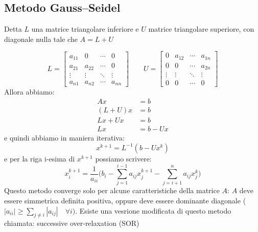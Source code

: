 \documentclass[10pt,a4paper]{article}
\begin{document}
\subsection{Metodo Gauss–Seidel}
Detta $L$ una matrice triangolare inferiore e $U$ matrice triangolare superiore, con diagonale nulla tale che $A = L + U$

\begin{equation}
L = 
\begin{bmatrix} 
a_{11} & 0 & \cdots & 0 \\ 
a_{21} & a_{22} & \cdots & 0 \\
\vdots & \vdots & \ddots & \vdots \\
a_{n1} & a_{n2} & \cdots & a_{nn} 
\end{bmatrix}
\qquad
U = 
\begin{bmatrix}
0 & a_{12} & \cdots & a_{1n} \\
0 & 0 & \cdots & a_{2n} \\
\vdots & \vdots & \ddots & \vdots \\
0 & 0 & \cdots & 0 
\end{bmatrix}
\end{equation}
Allora abbiamo:
\begin{align}
A x &= b \\
(L + U) x &= b \\
L x + U x &= b \\
L x &= b - U x
\end{align}
e quindi abbiamo in maniera iterativa:
\begin{equation}
x^{k+1} = L^{-1} (b - U x^{k})
\end{equation}
e per la riga i-esima di $x^{k+1}$ possiamo scrivere:
\begin{equation}
x^{k+1}_i  = \frac{1}{a_{ii}} \Bigg(b_i - \sum_{j=1}^{i-1}a_{ij}x^{k+1}_j - \sum_{j=i+1}^{n}a_{ij}x^{k}_j \Bigg)
\end{equation}
Questo metodo converge solo per alcune caratteristiche della matrice $A$: $A$ deve essere simmetrica definita positiva, oppure deve essere dominante diagonale ($|a_{ii}| \geq \sum_{j\neq i} |a_{ij}| \quad \forall i)$. Esiste una vesrione modificata di questo metodo chiamata: successive over-relaxation (SOR)
\end{document}
